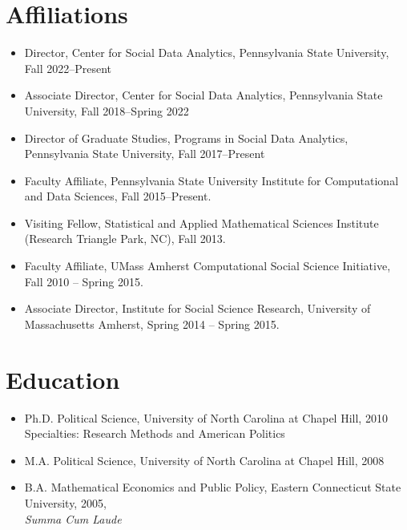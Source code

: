 \documentclass[overlapped,line]{res}
\begin{document}
\begin{resume}
\section{\bf Affiliations}
\begin{itemize}
\item Director, Center for Social Data Analytics, Pennsylvania State University, Fall 2022--Present
\item Associate Director, Center for Social Data Analytics, Pennsylvania State University, Fall 2018--Spring 2022
\item Director of Graduate Studies, Programs in Social Data Analytics, Pennsylvania State University, Fall 2017--Present
\item Faculty Affiliate, Pennsylvania State University Institute for Computational and Data Sciences, Fall 2015--Present.
\item Visiting Fellow, Statistical and Applied Mathematical Sciences Institute (Research Triangle Park, NC), Fall 2013.
\item Faculty Affiliate, UMass Amherst Computational Social Science Initiative, Fall 2010 -- Spring 2015.
\item Associate Director, Institute for Social Science Research, University of Massachusetts Amherst, Spring 2014 -- Spring 2015.
\end{itemize}

\section{\bf Education}
\begin{itemize} 
\item Ph.D. Political Science, University of North Carolina at Chapel Hill, 2010\\
Specialties: Research Methods and American Politics
\item M.A. Political Science, University of North Carolina at Chapel Hill, 2008

\item B.A. Mathematical Economics and Public Policy, Eastern Connecticut State University, 2005,
\\ {\it Summa Cum Laude}
\end{itemize}






\end{resume}
\end{document}
